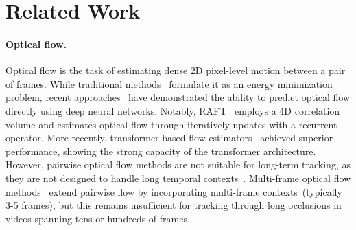 


\section{Related Work}\label{sec:related}


\paragraph{Optical flow.}
Optical flow is the task of estimating dense 2D pixel-level motion between a pair of frames. While traditional methods~\cite{black1993framework,beauchemin1995computation,horn1981determining,brox2009large,weinzaepfel2013deepflow,zach2007duality} formulate it as an energy minimization problem, recent approaches~\cite{fischer2015flownet,ilg2017flownet,sun2018pwc,hui2018liteflownet,xu2017accurate} have demonstrated the ability to predict optical flow directly using deep neural networks. Notably, RAFT~\cite{teed2020raft} employs a 4D correlation volume and estimates optical flow through iteratively updates with a recurrent operator. More recently, transformer-based flow estimators~\cite{huang2022flowformer,shi2023flowformer++,zhao2022global,jaegle2021perceiver} achieved superior performance, showing the strong capacity of the transformer architecture. However, pairwise optical flow methods are not suitable for long-term tracking, as they are not designed to handle long temporal contexts~\cite{brox2009large,weinzaepfel2013deepflow}. Multi-frame optical flow methods~\cite{ren2019fusion,janai2018unsupervised,irani1999multi,volz2011modeling,kennedy2015optical} extend pairwise flow by incorporating multi-frame contexts~(typically 3-5 frames), but this remains insufficient for tracking through long occlusions in videos spanning tens or hundreds of frames.

\vspace{-0.5em}
